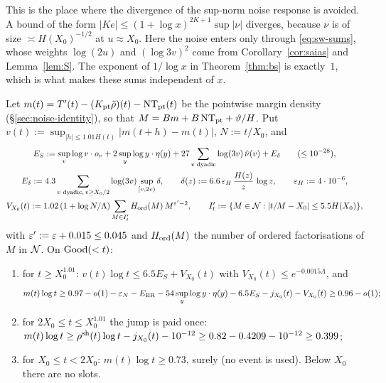 This is the place where the divergence of the sup-norm noise response is avoided. A bound of the form
$|Ke|\le(1+\log x)^{2K+1}\sup|\nu|$ diverges, because $\nu$ is of size $\asymp H(X_0)^{-1/2}$ at $u\approx X_0$. Here the noise
enters only through \eqref{eq:sw-sums}, whose weights $\log(2u)$ and $(\log3v)^2$ come from Corollary~\ref{cor:saias} and
Lemma~\ref{lem:S}. The exponent of $1/\log x$ in Theorem~\ref{thm:bs} is exactly~$1$, which is what makes these sums
independent of $x$.

\begin{proposition}\label{prop:pointwise}
Let $m(t)=T'(t)-(K_{\mathrm{pt}}\tilde\rho)(t)-\mathrm{NT}_{\mathrm{pt}}(t)$ be the pointwise margin density (\S\ref{sec:noise-identity}), so that
$M=Bm+B\,\mathrm{NT}_{\mathrm{pt}}+\vartheta/H$. Put $v(t):=\sup_{|h|\le1.01H(t)}|m(t+h)-m(t)|$, $N:=t/X_0$, and
\begin{gather*}
  E_S:=\sup_v\log v\cdot o_v+2\sup_y\log y\cdot\eta(y)+27\sum_{v\text{ dyadic}}\log(3v)\,\hat\nu(v)+E_\delta\qquad(\le10^{-28}),\\
  E_\delta:=4.3\sum_{v\text{ dyadic},\,v\ge X_0/2}\log(3v)\sup_{[v,2v)}\delta,\qquad\delta(z):=6.6\,\varepsilon_H\,\frac{H(z)}z\,\log z,\qquad
  \varepsilon_H:=4\cdot10^{-6},\\
  V_{X_0}(t):=1.02\,(1+\log N/\Lambda)\sum_{M\in I'_t}H_{\mathrm{ord}}(M)\,M^{\varepsilon'-2},\qquad I'_t:=\{M\in\mathcal{N}:|t/M-X_0|\le5.5H(X_0)\},
\end{gather*}
with $\varepsilon':=\varepsilon+0.015\le0.045$ and $H_{\mathrm{ord}}(M)$ the number of ordered factorisations of $M$ in $\mathcal{N}$. On $\mathrm{Good}(<t)$:
\begin{enumerate}[label=\textup{(\alph*)}]
\item for $t\ge X_0^{1.01}$: $v(t)\log t\le6.5E_S+V_{X_0}(t)$ with $V_{X_0}(t)\le e^{-0.0015\Lambda}$, and
  \[
    m(t)\log t\ge0.97-o(1)-\varepsilon_N-E_{\mathrm{BR}}-54\sup_y\log y\cdot\eta(y)-6.5E_S-j_{X_0}(t)-V_{X_0}(t)\ge0.96-o(1);
  \]
\item for $2X_0\le t\le X_0^{1.01}$ the jump is paid once:
  $m(t)\log t\ge\rho^{\mathrm{sh}}(t)\log t-j_{X_0}(t)-10^{-12}\ge0.82-0.4209-10^{-12}\ge0.399$;
\item for $X_0\le t<2X_0$: $m(t)\log t\ge0.73$, surely (no event is used). Below $X_0$ there are no slots.
\end{enumerate}
\end{proposition}

